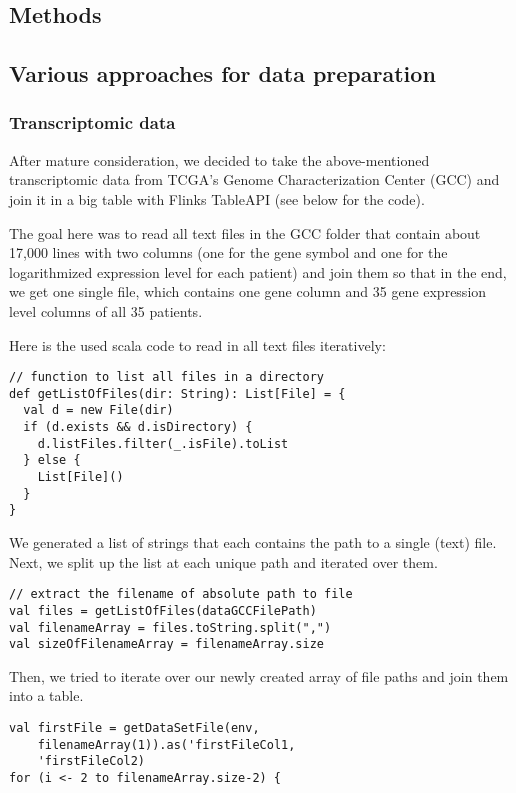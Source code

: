 \documentclass{bioinfo}
\begin{document}
\begin{methods}
\section{Methods}

\subsection{Various approaches for data preparation}

\subsubsection{Transcriptomic data}
After mature consideration, we decided to take the above-mentioned transcriptomic data from TCGA's Genome Characterization Center (GCC) and join it in a big table with Flinks TableAPI (see below for the code).

The goal here was to read all text files in the GCC folder that contain about 17,000 lines with two columns (one for the gene symbol and one for the logarithmized expression level for each patient) and join them so that in the end, we get one single file, which contains one gene column and 35 gene expression level columns of all 35 patients.

Here is the used scala code to read in all text files iteratively:

\begin{verbatim}
// function to list all files in a directory
def getListOfFiles(dir: String): List[File] = {
  val d = new File(dir)
  if (d.exists && d.isDirectory) {
    d.listFiles.filter(_.isFile).toList
  } else {
    List[File]()
  }
}
\end{verbatim}

We generated a list of strings that each contains the path to a single (text) file.
Next, we split up the list at each unique path and iterated over them.

\begin{verbatim}
// extract the filename of absolute path to file 
val files = getListOfFiles(dataGCCFilePath)
val filenameArray = files.toString.split(",")
val sizeOfFilenameArray = filenameArray.size
\end{verbatim}

Then, we tried to iterate over our newly created array of file paths and join them into a table.

\begin{verbatim}
val firstFile = getDataSetFile(env,
	filenameArray(1)).as('firstFileCol1,
	'firstFileCol2)
for (i <- 2 to filenameArray.size-2) {


\end{verbatim}
\end{methods}
\end{document}
